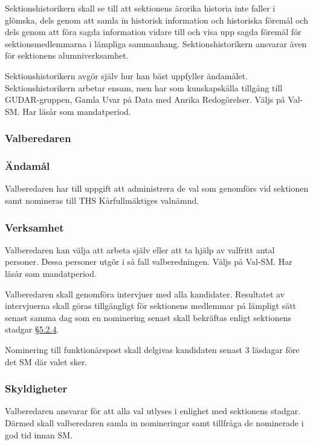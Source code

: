 \documentclass[a4paper,12pt]{article}
\begin{document}
Sektionshistorikern skall se till att sektionens ärorika historia inte faller i
glömska, dels genom att samla in historisk information och historiska föremål och dels genom att föra sagda information vidare till och visa upp sagda föremål för sektionsmedlemmarna i lämpliga sammanhang. Sektionshistorikern ansvarar även för sektionens alumniverksamhet.

Sektionshistorikern avgör själv hur han bäst uppfyller ändamålet. Sektionshistorikern arbetar ensam, men har som kunskapskälla tillgång till GUDAR-gruppen, Gamla Uvar på Data med Anrika Redogörelser. Väljs på Val-SM. Har läsår som mandatperiod.

\subsubsection{Valberedaren}

\subsubsection{Ändamål}

Valberedaren har till uppgift att administrera de val som genomförs vid sektionen samt nomineras till THS Kårfullmäktiges valnämnd.

\subsubsection{Verksamhet}

Valberedaren kan välja att arbeta själv eller att ta hjälp av valfritt antal personer. Dessa personer utgör i så fall valberedningen. Väljs på Val-SM. Har läsår som mandatperiod.

Valberedaren skall genomföra intervjuer med alla kandidater. Resultatet av intervjuerna skall göras tillgängligt för sektionens medlemmar på lämpligt sätt senast samma dag som en nominering senast skall bekräftas enligt sektionens stadgar \href{/sektionen/formalia/stadgar#funktionarer}{§5.2.4}.

Nominering till funktionärspost skall delgivas kandidaten senast 3 läsdagar före det SM där valet sker.

\subsubsection{Skyldigheter}

Valberedaren ansvarar för att alla val utlyses i enlighet med sektionens stadgar. Därmed skall valberedaren samla in nomineringar samt tillfråga de nominerade i god tid innan SM.
\end{document}
